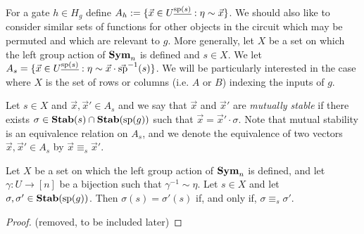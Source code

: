 \documentclass[../paper.tex]{subfiles}
\begin{document}

For a gate $h \in H_g$ define $A_h := \{\vec{x} \in U^{\underline{\text{sp}(s)}} :
\eta \sim \vec{x}\}$. We should also like to consider similar sets of functions
for other objects in the circuit which may be permuted and which are relevant to
$g$. More generally, let $X$ be a set on which the left group action of $\text{\textbf{Sym}}_n$
is defined and $s \in X$. We let $A_s = \{\vec{x} \in U^{\underline{\text{sp}(s)}}
: \eta \sim \vec{x} \cdot \vec{\text{sp}}^{-1}(s) \}$. We will be particularly
interested in the case where $X$ is the set of rows or columns (i.e. $A$ or $B$)
indexing the inputs of $g$.


Let $s \in X$ and $\vec{x}, \vec{x}' \in A_s$ and we say that $\vec{x}$ and
$\vec{x}'$ are \emph{mutually stable} if there exists $\sigma \in \text{\textbf{Stab}}(s) \cap
\text{\textbf{Stab}} (\text{sp} (g))$ such that $\vec{x} = \vec{x}' \cdot \sigma$. Note that mutual
stability is an equivalence relation on $A_s$, and we denote the equivalence of
two vectors $\vec{x}, \vec{x}' \in A_s$ by $\vec{x} \equiv_s \vec{x}'$.

\begin{lem}
  Let $X$ be a set on which the left group action of $\text{\textbf{Sym}}_n$ is defined, and
  let $\gamma: U \rightarrow [n]$ be a bijection such that $\gamma^{-1} \sim
  \eta$. Let $s \in X$ and let $\sigma, \sigma' \in \text{\textbf{Stab}}(\text{sp}(g))$. Then
  $\sigma(s) = \sigma' (s)$ if, and only if, $\sigma \equiv_s \sigma'$.
  \label{lem:functions-well-defined}
\end{lem}

\begin{proof}
  (removed, to be included later)
\end{proof}


\end{document}
